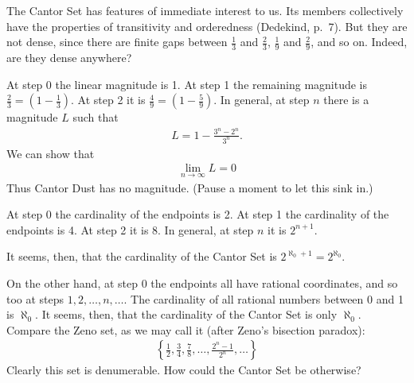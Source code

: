 \documentclass[polutonikogreek,english,twoside,openright]{article}
\begin{document}
\begin{enumerate}
\begin{enumerate}[A.]
    The Cantor Set has features of immediate interest to us. Its
    members collectively have the properties of transitivity and
    orderedness (Dedekind, p.~7). But they are not dense, since there
    are finite gaps between $\frac{1}{3}$ and $\frac{2}{3}$,
    $\frac{1}{9}$ and $\frac{2}{9}$, and so on. Indeed, are they dense
    anywhere?

    At step 0 the linear magnitude is 1. At step 1 the remaining
    magnitude is $\frac{2}{3}=(1-\frac{1}{3})$. At step 2 it is
    $\frac{4}{9}=(1-\frac{5}{9})$. In general, at step $n$ there is a
    magnitude $L$ such that
    \begin{align*}
      L=1-\frac{3^n-2^n}{3^n}.
    \end{align*}
    We can show that
    \begin{align*}
      \lim_{n\to\infty}L=0
    \end{align*}
    Thus Cantor Dust has no magnitude. (Pause a moment to let this
    sink in.)\label{CantorDust}

    At step 0 the cardinality of the endpoints is 2. At step 1 the
    cardinality of the endpoints is 4. At step 2 it is 8. In general,
    at step $n$ it is $2^{n+1}$.

    It seems, then, that the cardinality of the Cantor Set is
    $2^{\aleph_0+1}=2^{\aleph_0}$.

    On the other hand, at step 0 the endpoints all have rational
    coordinates, and so too at steps $1, 2, \dotsc, n, \dotsc$. The
    cardinality of all rational numbers between 0 and 1 is
    $\aleph_0$. It seems, then, that the cardinality of the Cantor Set
    is only $\aleph_0$. Compare the Zeno set, as we may call it (after
    Zeno's bisection paradox):
    \begin{align*}
      \left\{\frac{1}{2}, \frac{3}{4}, \frac{7}{8}, \dotsc, \frac{2^n-1}{2^n}, \dotsc\right\}
    \end{align*}
    Clearly this set is denumerable. How could the Cantor Set be
    otherwise?


\end{enumerate}
\end{enumerate}
\end{document}
